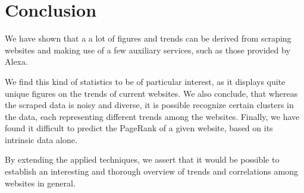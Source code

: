 \section{Conclusion}
\label{sec:conclusion}

We have shown that a a lot of figures and trends can be derived from scraping websites and making use of a few auxiliary services, such as those provided by Alexa. 

We find this kind of statistics to be of particular interest, as it displays quite unique figures on the trends of current websites. We also conclude, that whereas the scraped data is noisy and diverse, it is possible recognize certain clusters in the data, each representing different trends among the websites. Finally, we have found it difficult to predict the PageRank of a given website, based on its intrinsic data alone.

By extending the applied techniques, we assert that it would be possible to establish an interesting and thorough overview of trends and correlations among websites in general.